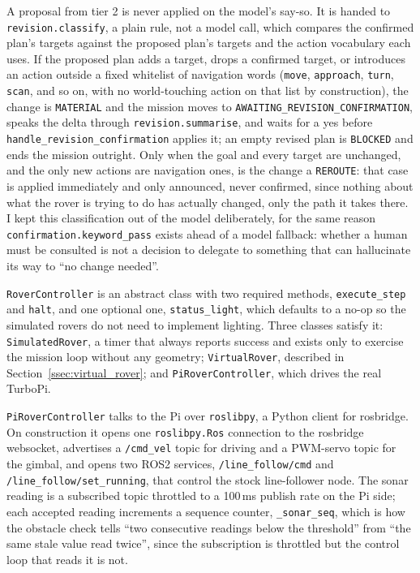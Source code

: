 A proposal from tier 2 is never applied on the model's say-so. It is handed
to \texttt{revision.classify}, a plain rule, not a model call, which compares
the confirmed plan's targets against the proposed plan's targets and the
action vocabulary each uses. If the proposed plan adds a target, drops a
confirmed target, or introduces an action outside a fixed whitelist of
navigation words (\texttt{move}, \texttt{approach}, \texttt{turn},
\texttt{scan}, and so on, with no world-touching action on that list by
construction), the change is \texttt{MATERIAL} and the mission moves to
\texttt{AWAITING\_REVISION\_CONFIRMATION}, speaks the delta through
\texttt{revision.summarise}, and waits for a yes before
\texttt{handle\_revision\_confirmation} applies it; an empty revised plan is
\texttt{BLOCKED} and ends the mission outright. Only when the goal and every
target are unchanged, and the only new actions are navigation ones, is the
change a \texttt{REROUTE}: that case is applied immediately and only
announced, never confirmed, since nothing about what the rover is trying to
do has actually changed, only the path it takes there. I kept this
classification out of the model deliberately, for the same reason
\texttt{confirmation.keyword\_pass} exists ahead of a model fallback: whether
a human must be consulted is not a decision to delegate to something that can
hallucinate its way to ``no change needed''.

\label{sec:rover_client}

\label{ssec:pi_rover}

\texttt{RoverController} is an abstract class with two required methods,
\texttt{execute\_step} and \texttt{halt}, and one optional one,
\texttt{status\_light}, which defaults to a no-op so the simulated rovers do not
need to implement lighting. Three classes satisfy it: \texttt{SimulatedRover}, a
timer that always reports success and exists only to exercise the mission loop
without any geometry; \texttt{VirtualRover}, described in
Section~\ref{ssec:virtual_rover}; and \texttt{PiRoverController}, which drives
the real TurboPi.

\texttt{PiRoverController} talks to the Pi over \texttt{roslibpy}, a Python
client for rosbridge. On construction it opens one \texttt{roslibpy.Ros}
connection to the rosbridge websocket, advertises a \texttt{/cmd\_vel} topic for
driving and a PWM-servo topic for the gimbal, and opens two ROS2 services,
\texttt{/line\_follow/cmd} and \texttt{/line\_follow/set\_running}, that control
the stock line-follower node. The sonar reading is a subscribed topic throttled
to a 100\,ms publish rate on the Pi side; each accepted reading increments a
sequence counter, \texttt{\_sonar\_seq}, which is how the obstacle check tells
``two consecutive readings below the threshold'' from ``the same stale value read
twice'', since the subscription is throttled but the control loop that reads it
is not.

